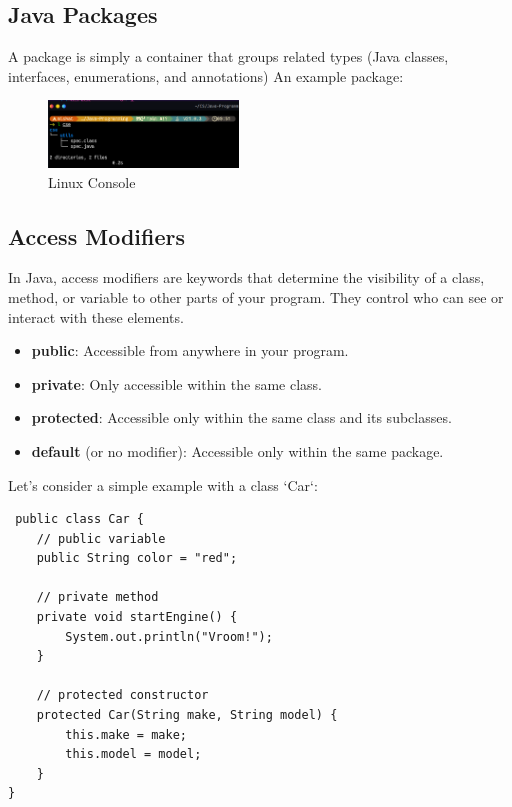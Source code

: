 \documentclass{book}
\begin{document}
\subsection{Java Packages}
A package is simply a container that groups related types (Java classes, interfaces, enumerations, and annotations)
An example package:
\begin{figure}
	\centering
	\includegraphics[width=0.45\textwidth]{../pngs/package.png}
	\caption{Linux Console}
\end{figure}

\subsection{Access Modifiers}
In Java, access modifiers are keywords that determine the visibility of a class, method, or variable to other parts of your program. They control
who can see or interact with these elements.
\begin{itemize}

	\item \textbf{public}: Accessible from anywhere in your program.
	\item \textbf{private}: Only accessible within the same class.
	\item \textbf{protected}: Accessible only within the same class and its subclasses.
	\item \textbf{default} (or no modifier): Accessible only within the same package.
\end{itemize}
Let's consider a simple example with a class `Car`:
\begin{verbatim}
 public class Car {
    // public variable
    public String color = "red";

    // private method
    private void startEngine() {
        System.out.println("Vroom!");
    }

    // protected constructor
    protected Car(String make, String model) {
        this.make = make;
        this.model = model;
    }
}  
\end{verbatim}
\end{document}
